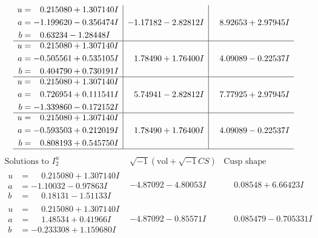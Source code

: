 \documentclass[1p]{elsarticle_modified}
\theoremstyle{definition}
\newcommand{\I}{\sqrt{-1}}
\begin{document}
$$\begin{array}{c|c|c}
\begin{aligned}
u &= \phantom{-}0.215080 + 1.307140 I \\
a &= -1.199620 - 0.356474 I \\
b &= \phantom{-}0.63234 - 1.28448 I\end{aligned}
 & -1.17182 - 2.82812 I & \phantom{-}8.92653 + 2.97945 I \\ \hline\begin{aligned}
u &= \phantom{-}0.215080 + 1.307140 I \\
a &= -0.505561 + 0.535105 I \\
b &= \phantom{-}0.404790 + 0.730191 I\end{aligned}
 & \phantom{-}1.78490 + 1.76400 I & \phantom{-}4.09089 - 0.22537 I \\ \hline\begin{aligned}
u &= \phantom{-}0.215080 + 1.307140 I \\
a &= \phantom{-}0.726954 + 0.111541 I \\
b &= -1.339860 - 0.172152 I\end{aligned}
 & \phantom{-}5.74941 - 2.82812 I & \phantom{-}7.77925 + 2.97945 I \\ \hline\begin{aligned}
u &= \phantom{-}0.215080 + 1.307140 I \\
a &= -0.593503 + 0.212019 I \\
b &= \phantom{-}0.808193 + 0.545750 I\end{aligned}
 & \phantom{-}1.78490 + 1.76400 I & \phantom{-}4.09089 - 0.22537 I\\
 \hline 
 \end{array}$$\newpage$$\begin{array}{c|c|c}  
\text{Solutions to }I^u_{2}& \I (\text{vol} + \sqrt{-1}CS) & \text{Cusp shape}\\
 \hline 
\begin{aligned}
u &= \phantom{-}0.215080 + 1.307140 I \\
a &= -1.10032 - 0.97863 I \\
b &= \phantom{-}0.18131 - 1.51133 I\end{aligned}
 & -4.87092 - 4.80053 I & \phantom{-}0.08548 + 6.66423 I \\ \hline\begin{aligned}
u &= \phantom{-}0.215080 + 1.307140 I \\
a &= \phantom{-}1.48534 + 0.41966 I \\
b &= -0.233308 + 1.159680 I\end{aligned}
 & -4.87092 - 0.85571 I & \phantom{-}0.085479 - 0.705331 I \\ \hline\begin{aligned}

\end{aligned}
\end{array}$$
\end{document}
